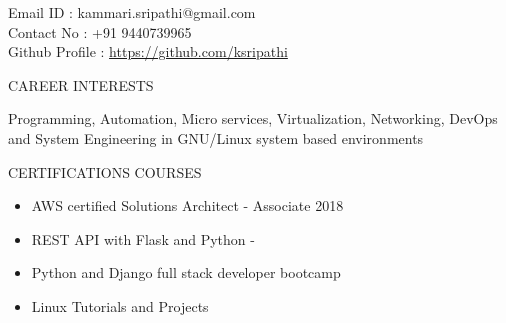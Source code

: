\documentclass{resume} %
\newcommand{\blank}[1]{\hspace*{#1}}
\begin{document}
\blank{5 cm}
{Email ID} \blank{0.7 cm} :
kammari.sripathi@gmail.com \\
\blank{5 cm} 
{Contact No} \blank{0.3 cm} :
+91 9440739965 \\
\blank{5 cm}
{Github Profile : }
\url{https://github.com/ksripathi}
\sectionlineskip \hfill


\begin{rSection}{CAREER INTERESTS}
  
  { Programming, Automation, Micro services, Virtualization,
    Networking, DevOps and System Engineering in GNU/Linux
    system based environments }

\end{rSection}


\begin{rSection}{CERTIFICATIONS COURSES}
  \begin{itemize}
  \item AWS certified Solutions Architect - Associate 2018 
  \item REST API with Flask and Python - 
  \item Python and Django full stack developer bootcamp
  \item Linux Tutorials and Projects
    
  \end{itemize}

\end{rSection}

\end{document}
